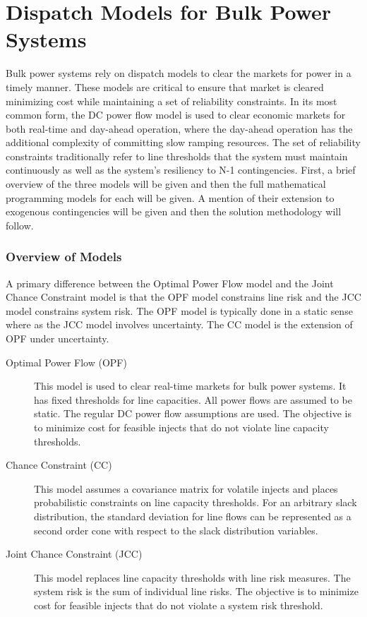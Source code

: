 \section{Dispatch Models for Bulk Power Systems}
Bulk power systems rely on dispatch models to clear the markets for power in a timely manner.  These models are critical to ensure that market is cleared minimizing cost while maintaining a set of reliability constraints.  In its most common form, the DC power flow model is used to clear economic markets for both real-time and day-ahead operation, where the day-ahead operation has the additional complexity of committing slow ramping resources.  The set of reliability constraints traditionally refer to line thresholds that the system must maintain continuously as well as the system's resiliency to N-1 contingencies.  First, a brief overview of the three models will be given and then the full mathematical programming models for each will be given.  A mention of their extension to exogenous contingencies will be given and then the solution methodology will follow.

\subsubsection{Overview of Models}
A primary difference between the Optimal Power Flow model and the Joint Chance Constraint model is that the OPF model constrains line risk and the JCC model constrains system risk.  The OPF model is typically done in a static sense where as the JCC model involves uncertainty. The CC model is the extension of OPF under uncertainty.
\begin{description}
\item[Optimal Power Flow (OPF)] This model is used to clear real-time markets for bulk power systems.  It has fixed thresholds for line capacities.  All power flows are assumed to be static.  The regular DC power flow assumptions are used.  The objective is to minimize cost for feasible injects that do not violate line capacity thresholds.
\item[Chance Constraint (CC)] This model assumes a covariance matrix for volatile injects and places probabilistic constraints on line capacity thresholds.  For an arbitrary slack distribution, the standard deviation for line flows can be represented as a second order cone with respect to the slack distribution variables.
\item[Joint Chance Constraint (JCC)] This model replaces line capacity thresholds with line risk measures.  The system risk is the sum of individual line risks.  The objective is to minimize cost for feasible injects that do not violate a system risk threshold.
\end{description}

